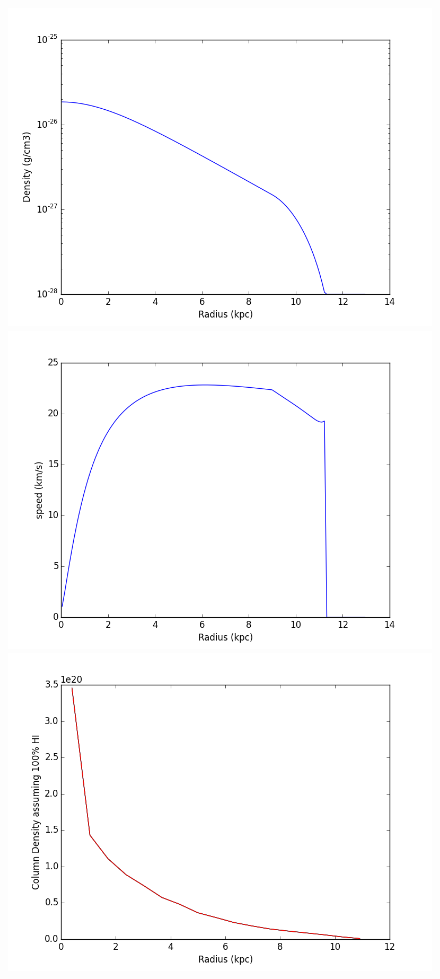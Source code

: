 \documentclass[12pt,preprint]{aastex}
\begin{document}
\begin{figure}
\includegraphics[scale=0.5]{dwarf_density_profile.png}\\
\includegraphics[scale=0.5]{dwarf_rotation_profile.png}\\
\includegraphics[scale=0.5]{dwarf_coldens_profile.png}
\end{figure}
\end{document}
